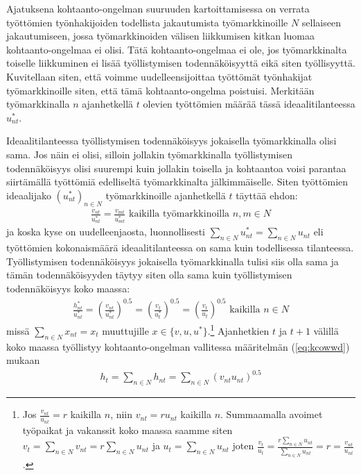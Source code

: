 \documentclass[12pt]{article}
\begin{document}
Ajatuksena kohtaanto-ongelman suuruuden kartoittamisessa on verrata työttömien työnhakijoiden todellista jakautumista työmarkkinoille $N$ sellaiseen jakautumiseen, jossa työmarkkinoiden välisen liikkumisen kitkan luomaa kohtaanto-ongelmaa ei olisi. Tätä kohtaanto-ongelmaa ei ole, jos työmarkkinalta toiselle liikkuminen ei lisää työllistymisen todennäköisyyttä eikä siten työllisyyttä. Kuvitellaan siten, että voimme uudelleensijoittaa työttömät työnhakijat työmarkkinoille siten, että tämä kohtaanto-ongelma poistuisi. Merkitään työmarkkinalla $n$ ajanhetkellä $t$ olevien työttömien määrää tässä ideaalitilanteessa $u_{nt}^*$.

Ideaalitilanteessa työllistymisen todennäköisyys jokaisella työmarkkinalla olisi sama. Jos näin ei olisi, silloin jollakin työmarkkinalla työllistymisen todennäköisyys olisi suurempi kuin jollakin toisella ja kohtaantoa voisi parantaa siirtämällä työttömiä edelliseltä työmarkkinalta jälkimmäiselle. Siten työttömien ideaalijako $(u_{nt}^*)_{n \in N}$ työmarkkinoille ajanhetkellä $t$ täyttää ehdon:
\begin{align}
\frac{v_{nt}}{u_{nt}^*} = \frac{v_{mt}}{u_{mt}^*} \textrm{ kaikilla työmarkkinoilla } n, m \in N
\label{eq:dfwewe}
\end{align}
ja koska kyse on uudelleenjaosta, luonnollisesti $\sum_{n \in N} u_{nt}^* = \sum_{n \in N} u_{nt}$ eli työttömien kokonaismäärä ideaalitilanteessa on sama kuin todellisessa tilanteessa. Työllistymisen todennäköisyys jokaisella työmarkkinalla tulisi siis olla sama ja tämän todennäköisyyden täytyy siten olla sama kuin työllistymisen todennäköisyys koko maassa:
\begin{align}
\frac{h_{nt}^*}{u_{nt}^*} = \left ( \frac{v_{nt}}{u_{nt}^*} \right )^{0.5} = \left ( \frac{v_{t}}{u_{t}^*} \right )^{0.5} = \left ( \frac{v_{t}}{u_{t}} \right )^{0.5} \textrm{ kaikilla } n \in N \label{eq:029y}
\end{align}
missä $\sum_{n\in N} x_{nt}=x_t$ muuttujille $x \in \{v, u, u^*\}$.\footnote{Jos $\frac{v_{nt}}{u_{nt}} = r$ kaikilla $n$, niin $v_{nt} = r u_{nt}$ kaikilla $n$. Summaamalla avoimet työpaikat ja vakanssit koko maassa saamme siten $v_t = \sum_{n \in N} v_{nt} = r \sum_{n\in N} u_{nt}$ ja $u_t = \sum_{n \in N} u_{nt}$ joten $\frac{v_t}{u_t} = \frac{r \sum_{n\in N} u_{nt}}{\sum_{n \in N} u_{nt}} = r = \frac{v_{nt}}{u_{nt}}$.} Ajanhetkien $t$ ja $t+1$ välillä koko maassa työllistyy kohtaanto-ongelman vallitessa määritelmän (\ref{eq:kcowwd}) mukaan
\begin{align}
h_t=\sum_{n\in N} h_{nt}=\sum_{n\in N}\left(v_{nt}u_{nt}\right)^{0.5}
\end{align}
\end{document}
